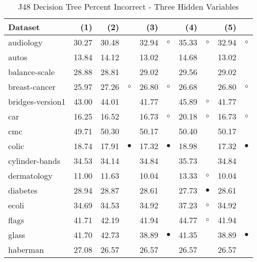 \newpage
{\centering \footnotesize \begin{longtable}{lrr@{\hspace{0.1cm}}cr@{\hspace{0.1cm}}cr@{\hspace{0.1cm}}cr@{\hspace{0.1cm}}c}
\caption{\label{j48pi3}J48 Decision Tree Percent Incorrect - Three Hidden Variables}
\\
\hline
Dataset & (1)& (2) & & (3) & & (4) & & (5) & \\
\hline
audiology & 30.27 & 30.48 &           & 32.94 &   $\circ$ & 35.33 &   $\circ$ & 32.94 &   $\circ$\\
autos & 13.84 & 14.12 &           & 13.02 &           & 14.68 &           & 13.02 &          \\
balance-scale & 28.88 & 28.81 &           & 29.02 &           & 29.56 &           & 29.02 &          \\
breast-cancer & 25.97 & 27.26 &   $\circ$ & 26.80 &   $\circ$ & 26.68 &           & 26.80 &   $\circ$\\
bridges-version1 & 43.00 & 44.01 &           & 41.77 &           & 45.89 &   $\circ$ & 41.77 &          \\
car & 16.25 & 16.52 &           & 16.73 &   $\circ$ & 20.18 &   $\circ$ & 16.73 &   $\circ$\\
cmc & 49.71 & 50.30 &           & 50.17 &           & 50.40 &           & 50.17 &          \\
colic & 18.74 & 17.91 & $\bullet$ & 17.32 & $\bullet$ & 18.98 &           & 17.32 & $\bullet$\\
cylinder-bands & 34.53 & 34.14 &           & 34.84 &           & 35.73 &           & 34.84 &          \\
dermatology & 11.00 & 11.63 &           & 10.04 &           & 13.33 &   $\circ$ & 10.04 &          \\
diabetes & 28.94 & 28.87 &           & 28.61 &           & 27.73 & $\bullet$ & 28.61 &          \\
ecoli & 34.69 & 34.53 &           & 34.92 &           & 37.23 &   $\circ$ & 34.92 &          \\
flags & 41.71 & 42.19 &           & 41.94 &           & 44.77 &   $\circ$ & 41.94 &          \\
glass & 41.70 & 42.73 &           & 38.89 & $\bullet$ & 41.35 &           & 38.89 & $\bullet$\\
haberman & 27.08 & 26.57 &           & 26.57 &           & 26.57 &           & 26.57 &          \\

\end{longtable}}
